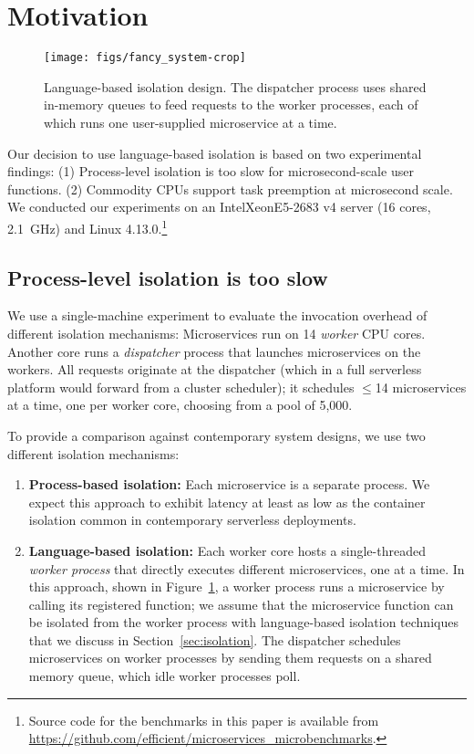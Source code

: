\section{Motivation}
\label{sec:motive}

\begin{figure}
\texttt{[image: figs/fancy\_system-crop]}
\caption{Language-based isolation design.  The dispatcher process
uses shared in-memory queues to feed requests to the worker processes, each of
which runs one user-supplied microservice at a time.}
\label{fig:sysdesign}
\end{figure}

Our decision to use language-based isolation is based on two experimental
findings:  (1) Process-level isolation is too slow for
microsecond-scale user functions. (2) Commodity
CPUs support task preemption at microsecond scale.  We conducted our experiments
on an Intel\textregistered\@ Xeon\textregistered\@ E5-2683 v4 server (16 cores, 2.1~GHz) and
Linux 4.13.0.\footnote{Source code for the benchmarks in this paper is available from
\scriptsize \url{https://github.com/efficient/microservices_microbenchmarks}.}

\subsection{Process-level isolation is too slow}
We use a single-machine experiment to evaluate the invocation overhead of different
isolation mechanisms: Microservices run on 14 \emph{worker} CPU cores. Another
core runs a \emph{dispatcher} process that launches microservices on the
workers.  All requests originate
at the dispatcher (which in a full serverless platform would
forward from a cluster scheduler); it schedules $\le$14
microservices at a time, one per worker core, choosing from a pool of 5,000.

To provide a comparison against contemporary system designs, we use two different
isolation mechanisms:
\begin{enumerate}
\item \textbf{Process-based isolation:} Each microservice is a separate process.
We expect this approach to exhibit latency at least as low as the container isolation
common in contemporary serverless deployments.
\item \textbf{Language-based isolation:} Each worker core hosts a single-threaded
\emph{worker process} that directly executes different microservices, one at a time.
In this approach, shown in Figure~\ref{fig:sysdesign}, a worker process runs a
microservice by calling its registered
function; we assume that the microservice function can be isolated from the
worker process with language-based isolation techniques that we discuss in
Section~\ref{sec:isolation}. The dispatcher schedules microservices on worker
processes by sending them
requests on a shared memory queue, which idle worker processes poll.
\end{enumerate}

